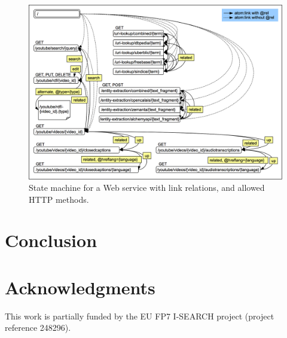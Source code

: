 \documentclass{acm_proc_article-sp}
\begin{document}
\begin{figure}
 \centering
 \includegraphics[width=\linewidth]{statemachine.png}
 \caption{State machine for a Web service with link relations, and allowed HTTP methods.}
 \label{fig:statemachine}
\end{figure}

\section{Conclusion}\label{sec:conclusion}


\section{Acknowledgments}\label{sec:acknowledgments}
This work is partially funded by the EU FP7 I-SEARCH project (project reference 248296).

%

%
%

\end{document}
